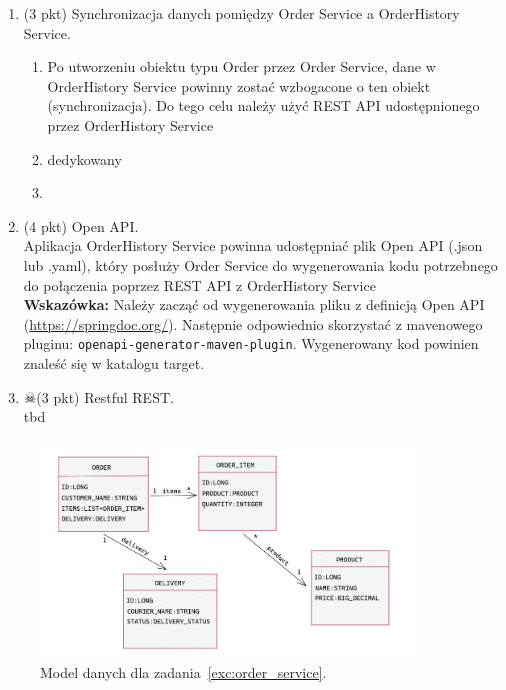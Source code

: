 \documentclass[12pt]{article}
\begin{document}
\begin{enumerate}
        \item\label{exc:cqrs_sync}
            (3 pkt) Synchronizacja danych pomiędzy Order Service a OrderHistory Service.\\
            \begin{enumerate}
                \item Po utworzeniu obiektu typu Order przez Order Service, dane w OrderHistory Service powinny zostać wzbogacone o ten obiekt (synchronizacja). 
                Do tego celu należy użyć REST API udostępnionego przez OrderHistory Service
                \item dedykowany 
                \item 
            \end{enumerate}
        \item\label{exc:openapi}
            (4 pkt) Open API.\\
            Aplikacja OrderHistory Service powinna udostępniać plik Open API (.json lub .yaml), który posłuży Order Service do wygenerowania kodu potrzebnego do połączenia poprzez REST API z OrderHistory Service\\
            \textbf{Wskazówka:} Należy zacząć od wygenerowania pliku z definicją Open API (\url{https://springdoc.org/}). Następnie odpowiednio skorzystać z mavenowego pluginu: \texttt{openapi-generator-maven-plugin}. Wygenerowany kod powinien znaleść się w katalogu target.
        \item\label{exc:openapi}
        $\skull$(3 pkt) Restful REST.\\
            tbd
\end{enumerate}
    \begin{figure}[p]
        \centering
        \includegraphics[width=0.9\textwidth]{cud_model.png}
        \caption{Model danych dla zadania~\ref{exc:order_service}.}
        \label{fig:cud-model}
    \end{figure}  
\end{document}
